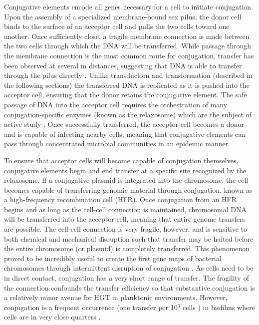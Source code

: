 Conjugative elements encode all genes necessary for a cell to initiate conjugation.
Upon the assembly of a specialized membrane-bound sex pilus, the donor cell
binds to the surface of an acceptor cell and pulls the two cells toward
one another. Once sufficiently close, a fragile membrane connection is made
between the two cells through which the DNA will be transferred. While passage
through the membrane connection is the most common route for conjugation,
transfer has been observed at several \textmu m distances, suggesting that DNA
is able to transfer through the pilus directly \cite{Babic:2008bl}. Unlike
transduction and transformation (described in the following sections) the
transferred DNA is replicated as it is pushed into the acceptor cell, ensuring that
the donor retains the conjugative element. The safe passage of DNA into the acceptor cell
requires the orchestration of many conjugation-specific enzymes (known as the
relaxosome) which are the subject of active study \cite{Guglielmini:2014bc}.
Once successfully transferred, the acceptor cell becomes a donor and is capable
of infecting nearby cells, meaning that conjugative elements can pass
through concentrated microbial communities in an epidemic manner.

To ensure that acceptor cells will become capable of conjugation themselves,
conjugative elements begin  and end transfer at a specific site recognized by
the relaxosome. If a conjugative plasmid is integrated into the chromosome, the
cell becomes capable of transferring genomic material through conjugation, known
as a high-frequency recombination cell (HFR). Once conjugation from an HFR
begins and as long as the cell-cell connection is maintained, chromosomal DNA
will be transferred into the acceptor cell, meaning that entire genome transfers are
possible.  The cell-cell connection is very fragile, however, and is sensitive
to both chemical and mechanical disruption such that transfer may be  halted
before the entire chromosome (or plasmid) is completely transferred. This
phenomenon proved to be incredibly useful to create the first gene maps of
bacterial chromosomes through intermittent disruption of conjugation
\cite{Bresler:1978uv}. As cells need to be in direct contact, conjugation has a
very short range of transfer. The fragility of the connection confounds the
transfer efficiency so that substantive conjugation is a relatively minor avenue
for HGT in planktonic environments. However, conjugation is a frequent
occurrence (one transfer per 10$^{3}$ cells \cite{Molin:2003cqa, Li:2001km,
Hausner:1999ua}) in biofilms where cells are in very close quarters
\cite{Sorensen:2005jw}. 

